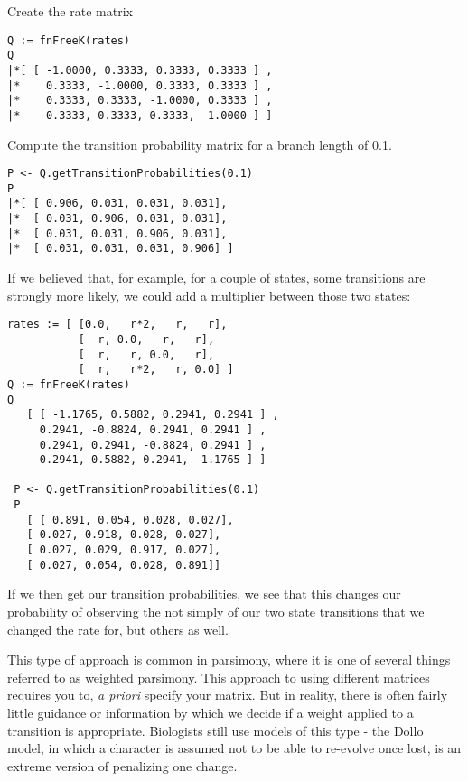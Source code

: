 Create the rate matrix
{\tt \begin{snugshade*}
\begin{lstlisting}
Q := fnFreeK(rates)
Q
|*[ [ -1.0000, 0.3333, 0.3333, 0.3333 ] ,
|*    0.3333, -1.0000, 0.3333, 0.3333 ] ,
|*    0.3333, 0.3333, -1.0000, 0.3333 ] ,
|*    0.3333, 0.3333, 0.3333, -1.0000 ] ]
\end{lstlisting}
\end{snugshade*}}

Compute the transition probability matrix for a branch length of 0.1.

{\tt \begin{snugshade*}
\begin{lstlisting}
P <- Q.getTransitionProbabilities(0.1)
P
|*[ [ 0.906, 0.031, 0.031, 0.031],
|*  [ 0.031, 0.906, 0.031, 0.031],
|*  [ 0.031, 0.031, 0.906, 0.031],
|*  [ 0.031, 0.031, 0.031, 0.906] ]
\end{lstlisting}
\end{snugshade*}}

If we believed that, for example, for a couple of states, some transitions are strongly more likely, we could add a multiplier between those two states:

{\tt \begin{snugshade*}
\begin{lstlisting}
rates := [ [0.0,   r*2,   r,   r],
           [  r, 0.0,   r,   r],
           [  r,   r, 0.0,   r],
           [  r,   r*2,   r, 0.0] ]
Q := fnFreeK(rates)
Q
   [ [ -1.1765, 0.5882, 0.2941, 0.2941 ] ,
     0.2941, -0.8824, 0.2941, 0.2941 ] ,
     0.2941, 0.2941, -0.8824, 0.2941 ] ,
     0.2941, 0.5882, 0.2941, -1.1765 ] ]

 P <- Q.getTransitionProbabilities(0.1)
 P
   [ [ 0.891, 0.054, 0.028, 0.027], 
   [ 0.027, 0.918, 0.028, 0.027], 
   [ 0.027, 0.029, 0.917, 0.027], 
   [ 0.027, 0.054, 0.028, 0.891]]
\end{lstlisting}
\end{snugshade*}}

If we then get our transition probabilities, we see that this changes our probability of observing the not simply of our two state transitions that we changed the rate for, but others as well.

This type of approach is common in parsimony, where it is one of several things referred to as weighted parsimony. 
This approach to using different matrices requires you to, \textit{a priori} specify your matrix.
But in reality, there is often fairly little guidance or information by which we decide if a weight applied to a transition is appropriate.
Biologists still use models of this type - the Dollo model, in which a character is assumed not to be able to re-evolve once lost, is an extreme version of penalizing one change.

